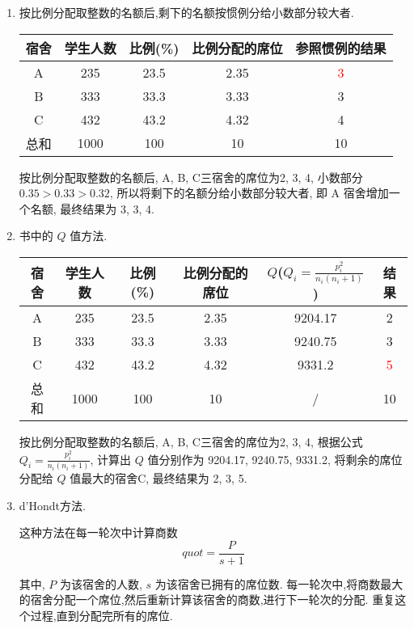 \documentclass{article}
\newcommand{\red}[1]{\textcolor{red}{#1}}
\begin{document}
\begin{enumerate}
    \item 按比例分配取整数的名额后,剩下的名额按惯例分给小数部分较大者.
    
\begin{center}
    \begin{tabular}{|c|c|c|c|c|}
    \hline
    宿舍 & 学生人数 & 比例(\%) & 比例分配的席位 & 参照惯例的结果 \\
    \hline
    A & 235 & 23.5 & 2.35 & \red{3} \\
    \hline
    B & 333 & 33.3 & 3.33 & 3 \\
    \hline
    C & 432 & 43.2 & 4.32 & 4 \\
    \hline
    总和 & 1000 & 100 & 10 & 10 \\
    \hline
    \end{tabular}
\end{center}

按比例分配取整数的名额后, A, B, C三宿舍的席位为2, 3, 4, 小数部分 $0.35>0.33>0.32$, 所以将剩下的名额分给小数部分较大者, 即 A 宿舍增加一个名额, 最终结果为 3, 3, 4.

\item 书中的 $Q$ 值方法.

\begin{center}
    \begin{tabular}{|c|c|c|c|c|c|}
    \hline
    宿舍 & 学生人数 & 比例(\%) & 比例分配的席位 & $Q$($Q_i=\frac{p_i^2}{n_i(n_i+1)}$) & 结果 \\
    \hline
    A & 235 & 23.5 & 2.35 & 9204.17 & 2 \\
    \hline
    B & 333 & 33.3 & 3.33 & 9240.75 & 3 \\
    \hline
    C & 432 & 43.2 & 4.32 & 9331.2 & \red{5} \\
    \hline
    总和 & 1000 & 100 & 10 & / & 10 \\
    \hline
    \end{tabular}
\end{center}

按比例分配取整数的名额后, A, B, C三宿舍的席位为2, 3, 4, 根据公式 $Q_i=\frac{p_i^2}{n_i(n_i+1)}$, 计算出 $Q$ 值分别作为 9204.17, 9240.75, 9331.2, 将剩余的席位分配给 $Q$ 值最大的宿舍C, 最终结果为 2, 3, 5.

\item d'Hondt方法.

这种方法在每一轮次中计算商数 $$quot = \frac{P}{s+1}$$

其中, $P$ 为该宿舍的人数, $s$ 为该宿舍已拥有的席位数. 每一轮次中,将商数最大的宿舍分配一个席位,然后重新计算该宿舍的商数,进行下一轮次的分配. 重复这个过程,直到分配完所有的席位.


\end{enumerate}
\end{document}
